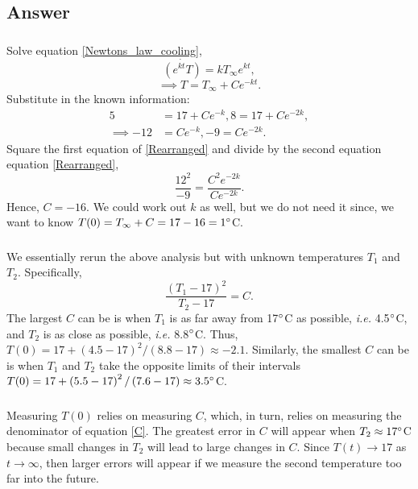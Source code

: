 \documentclass[10pt]{article}
\newcommand{\bb}{\begin{equation}}
\newcommand{\ee}{\end{equation}}
\newcommand{\eqn}[1]{equation \eqref{#1}}
\newcommand{\ie}{\emph{i.e.} }
\renewcommand{\l}{\left(}
\renewcommand{\r}{\right)}
\begin{document}
\begin{Answ}
\subsection{Answer}
\subsubsection{}
Solve \eqn{Newtons_law_cooling},
\bb
\dot{\l e^{kt}T\r}=kT_\infty e^{kt},
\ee
\bb
\implies T=T_\infty+Ce^{-kt}.
\ee
Substitute in the known information:
\begin{align}
5&=17 +Ce^{-k},8=17+Ce^{-2k},\\
\implies -12&= Ce^{-k},-9=Ce^{-2k}.\label{Rearranged}
\end{align}
Square the first equation of \eqref{Rearranged} and divide by the second equation \eqn{Rearranged},
\bb
\frac{12^2}{-9}=\frac{C^2e^{-2k}}{Ce^{-2k}}.
\ee
Hence, $C=-16$. We could work out $k$ as well, but we do not need it since, we want to know $T(0)=T_\infty+C=17-16=1\degree$C.

\subsubsection{}
We essentially rerun the above analysis but with unknown temperatures $T_1$ and $T_2$. Specifically,
\bb
\frac{\l T_1-17\r^2}{T_2-17}=C.\label{C}
\ee
The largest $C$ can be is when $T_1$ is as far away from 17$\degree$C as possible, \ie 4.5$\degree$C, and $T_2$ is as close as possible, \ie 8.8$\degree$C. Thus, $T(0)=17+\l 4.5-17\r^2/\l 8.8-17\r\approx-2.1$. Similarly, the smallest $C$ can be is when $T_1$ and $T_2$ take the opposite limits of their intervals $T(0)=17+\l 5.5-17\r^2/\l 7.6-17\r\approx3.5\degree$C.
\subsubsection{}
Measuring $T(0)$ relies on measuring $C$, which, in turn, relies on measuring the denominator of \eqn{C}. The greatest error in $C$ will appear when $T_2\approx17\degree$C because small changes in $T_2$ will lead to large changes in $C$. Since $T(t)\rightarrow 17$ as $t\rightarrow\infty$, then larger errors will appear if we measure the second temperature too far into the future.
\end{Answ}
\end{document}

